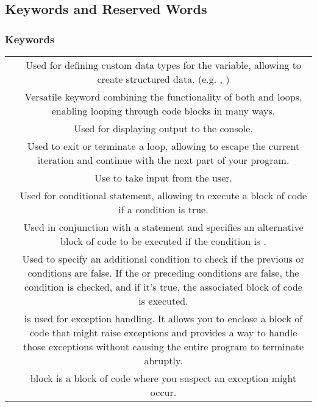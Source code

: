 \subsection{Keywords and Reserved Words}

\subsubsection{Keywords}
\begin{center}
  \begin{tabulary}{\linewidth}{|C|C|}
    \hline
     &  \\
    \hline
    \hline
     & Used for defining custom data types for the variable, allowing to create structured data. (e.g. , ) \\
    \hline
     & Versatile keyword combining the functionality of both  and  loops, enabling looping through code blocks in many ways. \\
    \hline
     & Used for displaying output to the console.\\
    \hline
     & Used to exit or terminate a loop, allowing to escape the current iteration and continue with the next part of your program. \\
    \hline
     & Use to take input from the user. \\
    \hline
     & Used for conditional statement, allowing to execute a block of code if a condition is true.\\
    \hline
     & Used in conjunction with a  statement and specifies an alternative block of code to be executed if the  condition is .\\
    \hline
     & Used to specify an additional condition to check if the previous  or  conditions are false. If the  or preceding  conditions are false, the  condition is checked, and if it's true, the associated block of code is executed. \\
    \hline
    &  is used for exception handling. It allows you to enclose a block of code that might raise exceptions and provides a way to handle those exceptions without causing the entire program to terminate abruptly. \\
     &  block is a block of code where you suspect an exception might occur. \\

\end{tabulary}
\end{center}
